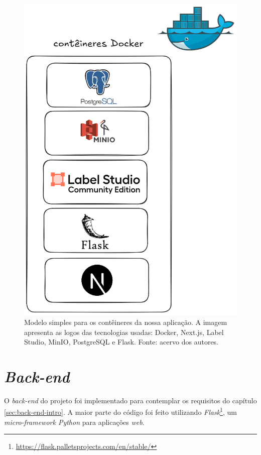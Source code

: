 \begin{figure}[htbp]
    \centering
    \includegraphics[height=0.5\textheight]{images/containers.png}
    \caption{\label{fig:containers} Modelo simples para os contêineres da nossa aplicação. A imagem apresenta as logos das tecnologias usadas: Docker, Next.js, Label Studio, MinIO, PostgreSQL e Flask. Fonte: acervo dos autores.}
\end{figure}

\section{\emph{Back-end}}
O \emph{back-end} do projeto foi implementado para contemplar os requisitos do capítulo \ref{sec:back-end-intro}. A maior parte do código foi feito utilizando \emph{Flask}\footnote{\url{https://flask.palletsprojects.com/en/stable/}}, um \emph{micro-framework Python} para aplicações \textit{web}.

